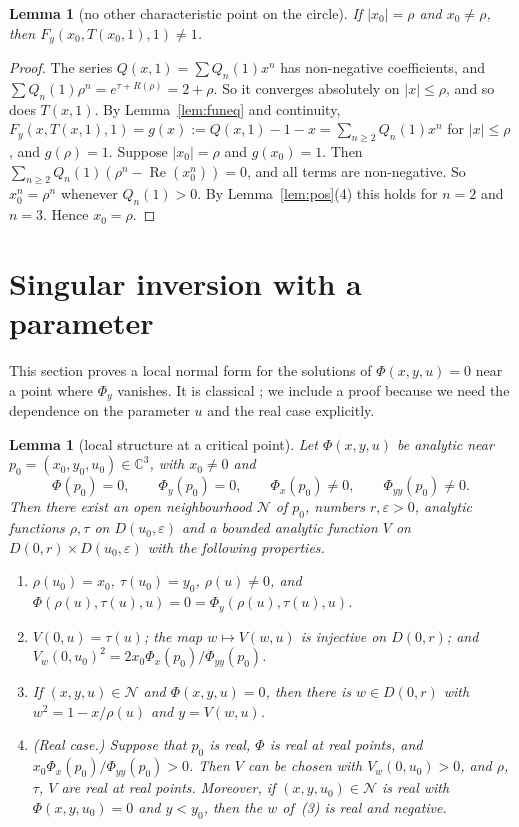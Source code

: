 \documentclass[11pt]{amsart}
\newtheorem{lemma}[theorem]{Lemma}
\theoremstyle{definition}
\theoremstyle{remark}
\numberwithin{equation}{section}
\DeclareMathOperator{\re}{Re}
\newcommand{\CC}{\mathbb{C}}
\newcommand{\cN}{\mathcal{N}}
\newcommand{\abs}[1]{\lvert #1\rvert}
\begin{document}
\begin{lemma}[no other characteristic point on the circle]\label{lem:circle}
If \(\abs{x_0}=\rho\) and \(x_0\ne\rho\), then \(F_y(x_0,T(x_0,1),1)\ne1\).
\end{lemma}

\begin{proof}
The series \(Q(x,1)=\sum Q_n(1)x^n\) has non-negative coefficients, and \(\sum Q_n(1)\rho^n=e^{\tau+R(\rho)}=2+\rho\). So it converges absolutely on \(\abs{x}\le\rho\), and so does \(T(x,1)\). By Lemma~\ref{lem:funeq} and continuity, \(F_y(x,T(x,1),1)=g(x):=Q(x,1)-1-x=\sum_{n\ge2}Q_n(1)x^n\) for \(\abs{x}\le\rho\), and \(g(\rho)=1\). Suppose \(\abs{x_0}=\rho\) and \(g(x_0)=1\). Then \(\sum_{n\ge2}Q_n(1)(\rho^n-\re(x_0^n))=0\), and all terms are non-negative. So \(x_0^n=\rho^n\) whenever \(Q_n(1)>0\). By Lemma~\ref{lem:pos}(4) this holds for \(n=2\) and \(n=3\). Hence \(x_0=\rho\).
\end{proof}

\section{Singular inversion with a parameter}\label{sec:inversion}

This section proves a local normal form for the solutions of \(\Phi(x,y,u)=0\) near a point where \(\Phi_y\) vanishes. It is classical \cite[\S VI.7, \S VII.4]{FS}; we include a proof because we need the dependence on the parameter \(u\) and the real case explicitly.

\begin{lemma}[local structure at a critical point]\label{lem:local}
Let \(\Phi(x,y,u)\) be analytic near \(p_0=(x_0,y_0,u_0)\in\CC^3\), with \(x_0\ne0\) and
\[
\Phi(p_0)=0,\qquad\Phi_y(p_0)=0,\qquad\Phi_x(p_0)\ne0,\qquad\Phi_{yy}(p_0)\ne0 .
\]
Then there exist an open neighbourhood \(\cN\) of \(p_0\), numbers \(r,\varepsilon>0\), analytic functions \(\rho,\tau\) on \(D(u_0,\varepsilon)\) and a bounded analytic function \(V\) on \(D(0,r)\times D(u_0,\varepsilon)\) with the following properties.
\begin{enumerate}
\item \(\rho(u_0)=x_0\), \(\tau(u_0)=y_0\), \(\rho(u)\ne0\), and \(\Phi(\rho(u),\tau(u),u)=0=\Phi_y(\rho(u),\tau(u),u)\).
\item \(V(0,u)=\tau(u)\); the map \(w\mapsto V(w,u)\) is injective on \(D(0,r)\); and \(V_w(0,u_0)^2=2x_0\Phi_x(p_0)/\Phi_{yy}(p_0)\).
\item If \((x,y,u)\in\cN\) and \(\Phi(x,y,u)=0\), then there is \(w\in D(0,r)\) with \(w^2=1-x/\rho(u)\) and \(y=V(w,u)\).
\item (Real case.) Suppose that \(p_0\) is real, \(\Phi\) is real at real points, and \(x_0\Phi_x(p_0)/\Phi_{yy}(p_0)>0\). Then \(V\) can be chosen with \(V_w(0,u_0)>0\), and \(\rho\), \(\tau\), \(V\) are real at real points. Moreover, if \((x,y,u_0)\in\cN\) is real with \(\Phi(x,y,u_0)=0\) and \(y<y_0\), then the \(w\) of~(3) is real and negative.
\end{enumerate}
\end{lemma}
\end{document}
